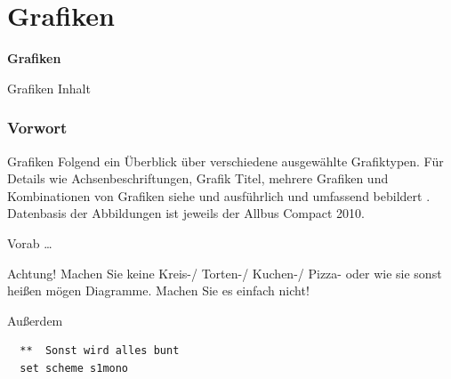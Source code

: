 \part{Grafiken}
\begin{frame}
\thispagestyle{empty}
\textbf{\huge{Grafiken}}
\end{frame}

\begin{frame}{Grafiken Inhalt}
 \tableofcontents
\end{frame}


\section{Vorwort}
\begin{frame}{Grafiken}
 Folgend ein Überblick über verschiedene ausgewählte Grafiktypen. Für Details wie Achsenbeschriftungen, Grafik Titel, mehrere Grafiken und Kombinationen von Grafiken siehe \textcite[Kap. 6]{Kohler2012} und ausführlich und umfassend bebildert \textcite{Mitchell2012}.\\
 Datenbasis der Abbildungen ist jeweils der Allbus Compact 2010.
\end{frame}

\begin{frame}[fragile]{Vorab \dots}
\begin{alertblock}{Achtung!}
Machen Sie keine Kreis-/ Torten-/ Kuchen-/ Pizza- oder wie sie sonst heißen mögen Diagramme. Machen Sie es einfach nicht!
\end{alertblock}
\end{frame}

\begin{frame}[fragile]{Außerdem}  
  \begin{lstlisting}
  **  Sonst wird alles bunt
  set scheme s1mono
 \end{lstlisting}
\end{frame}

